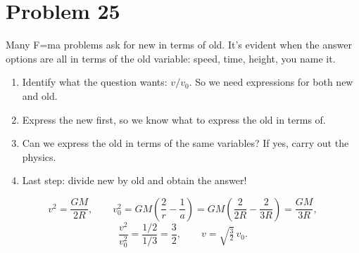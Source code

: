\documentclass[11pt]{article}
\begin{document}
\begin{center}
\end{center}

\section*{Problem 25}
Many F=ma problems ask for new in terms of old. It's evident when the answer options are all in terms of the old variable: speed, time, height, you name it.
\begin{enumerate}[leftmargin=*, itemsep=0.25em]
\item Identify what the question wants: $v/v_0$. So we need expressions for both new and old.
\item Express the new first, so we know what to express the old in terms of.
\item Can we express the old in terms of the same variables? If yes, carry out the physics.
\item Last step: divide new by old and obtain the answer!
\end{enumerate}
\[
v^2=\frac{GM}{2R},\qquad
v_0^2=GM\left(\frac2r-\frac1a\right)=GM\left(\frac2{2R}-\frac2{3R}\right)=\frac{GM}{3R},
\]
\[
\frac{v^2}{v_0^2}=\frac{1/2}{1/3}=\frac32,\qquad v=\sqrt{\tfrac32}\,v_0.
\]
\end{document}
